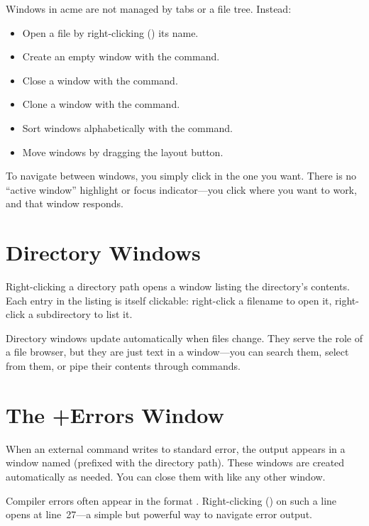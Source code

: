 
Windows in acme are not managed by tabs or a file tree.  Instead:

\begin{itemize}
\item Open a file by right-clicking () its name.
\item Create an empty window with the  command.
\item Close a window with the  command.
\item Clone a window with the  command.
\item Sort windows alphabetically with the  command.
\item Move windows by dragging the layout button.
\end{itemize}

To navigate between windows, you simply click in the one you want.
There is no ``active window'' highlight or focus indicator---you click
where you want to work, and that window responds.

\section{Directory Windows}

Right-clicking a directory path opens a window listing the directory's
contents.  Each entry in the listing is itself clickable: right-click a
filename to open it, right-click a subdirectory to list it.

Directory windows update automatically when files change.  They serve
the role of a file browser, but they are just text in a window---you
can search them, select from them, or pipe their contents through
commands.

\section{The +Errors Window}

When an external command writes to standard error, the output appears in
a window named  (prefixed with the directory path).
These windows are created automatically as needed.  You can close them
with  like any other window.

Compiler errors often appear in the format .
Right-clicking () on such a line opens  at
line~27---a simple but powerful way to navigate error output.
